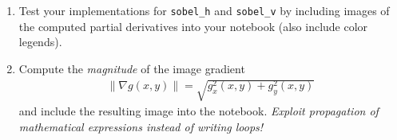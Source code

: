 \documentclass[12pt,a4paper]{article}
\begin{document}
\begin{samepage}
\begin{enumerate}
\begin{figure}[h!]
    \end{figure}
    \item Test your implementations for \texttt{sobel\_h} and \texttt{sobel\_v} by including images of the computed partial derivatives into your notebook (also include color legends).
    \item Compute the \emph{magnitude} of the image gradient \begin{gather*}\left\|\nabla g\left(x,y\right)\right\| = \sqrt{g_x^2\left(x,y\right) + g_y^2\left(x,y\right)}\end{gather*} and include the resulting image into the notebook. \emph{Exploit propagation of mathematical expressions instead of writing loops!}
\end{enumerate}
\end{samepage}
\end{document}
